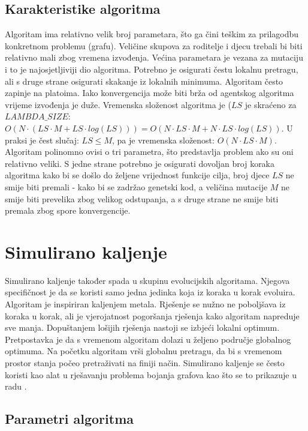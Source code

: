 \documentclass[times, utf8, diplomski, numeric]{fer}
\begin{document}
\subsection{Karakteristike algoritma}

Algoritam ima relativno velik broj parametara, što ga čini teškim za prilagodbu konkretnom problemu (grafu). Veličine skupova za roditelje i djecu trebali bi biti relativno mali zbog vremena izvođenja. Većina parametara je vezana za mutaciju i to je najosjetljiviji dio algoritma. Potrebno je osigurati čestu lokalnu pretragu, ali s druge strane osigurati skakanje iz lokalnih minimuma. Algoritam često zapinje na platoima. Iako konvergencija može biti brža od agentskog algoritma vrijeme izvođenja je duže.
Vremenska složenost algoritma je ($LS$ je skraćeno za $LAMBDA\_SIZE$: $O(N\cdot(LS \cdot M + LS\cdot log(LS)))=O(N\cdot LS\cdot M + N\cdot LS \cdot log(LS))$. U praksi je čest slučaj: $LS\le M$, pa je vremenska složenost: $O(N\cdot LS \cdot M)$. Algoritam polinomno ovisi o tri parametra, što predstavlja problem ako su oni relativno veliki. S jedne strane potrebno je osigurati dovoljan broj koraka algoritma kako bi se došlo do željene vrijednost funkcije cilja, broj djece $LS$ ne smije biti premali - kako bi se zadržao genetski kod, a veličina mutacije $M$ ne smije biti prevelika zbog velikog odstupanja, a s druge strane ne smije biti premala zbog spore konvergencije. 

\section{Simulirano kaljenje}

Simulirano kaljenje također spada u skupinu evolucijskih algoritama. Njegova specifičnost je da se koristi samo jedna jedinka koja iz koraka u korak evoluira. Algoritam je inspiriran kaljenjem metala. Rješenje se nužno ne poboljšava iz koraka u korak, ali je vjerojatnost pogoršanja rješenja kako algoritam napreduje sve manja. Dopuštanjem lošijih rješenja nastoji se izbjeći lokalni optimum. Pretpostavka je da s vremenom algoritam dolazi u željeno područje globalnog optimuma. Na početku algoritam vrši globalnu pretragu, da bi s vremenom prostor stanja počeo pretraživati na finiji način. Simulirano kaljenje se često koristi kao alat u rješavanju problema bojanja grafova kao što se to prikazuje u radu \cite{lit13}.

\subsection{Parametri algoritma}
\end{document}
